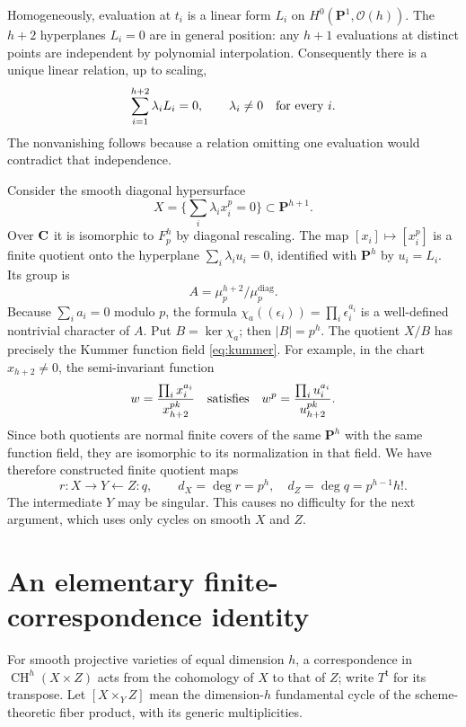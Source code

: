 \documentclass[11pt]{article}
\theoremstyle{remark}\newtheorem{remark}[theorem]{Remark}
\newcommand{\CH}{\operatorname{CH}}\newcommand{\Sym}{\operatorname{Sym}}
\begin{document}
Homogeneously, evaluation at $t_i$ is a linear form $L_i$ on
$H^0(\mathbf P^1,\mathcal O(h))$. The $h+2$ hyperplanes $L_i=0$ are in
general position: any $h+1$ evaluations at distinct points are independent
by polynomial interpolation. Consequently there is a unique linear
relation, up to scaling,
\[
 \sum_{i=1}^{h+2}\lambda_i L_i=0,
 \qquad \lambda_i\ne0\quad\hbox{for every }i.
\]
The nonvanishing follows because a relation omitting one evaluation would
contradict that independence.

Consider the smooth diagonal hypersurface
\[
 X=\{\textstyle\sum_i\lambda_i x_i^p=0\}\subset\mathbf P^{h+1}.
\]
Over $\mathbf C$ it is isomorphic to $F_p^h$ by diagonal rescaling. The map
$[x_i]\mapsto[x_i^p]$ is a finite quotient onto the hyperplane
$\sum_i\lambda_i u_i=0$, identified with $\mathbf P^h$ by $u_i=L_i$.
Its group is
\[
 A=\mu_p^{h+2}/\mu_p^{\mathrm{diag}}.
\]
Because $\sum_i a_i=0$ modulo $p$, the formula
$\chi_a((\epsilon_i))=\prod_i\epsilon_i^{a_i}$ is a well-defined
nontrivial character of $A$. Put $B=\ker\chi_a$; then $|B|=p^h$.
The quotient $X/B$ has precisely the Kummer function field
\eqref{eq:kummer}. For example, in the chart $x_{h+2}\ne0$, the
semi-invariant function
\[
 w=\frac{\prod_i x_i^{a_i}}{x_{h+2}^{pk}}
 \quad\hbox{satisfies}\quad
 w^p=\frac{\prod_i u_i^{a_i}}{u_{h+2}^{pk}}.
\]
Since both quotients are normal finite covers of the same $\mathbf P^h$
with the same function field, they are isomorphic to its normalization in
that field. We have therefore constructed finite quotient maps
\begin{equation}\label{eq:quotients}
 r:X\longrightarrow Y\longleftarrow Z:q,
 \qquad d_X=\deg r=p^h,\quad d_Z=\deg q=p^{h-1}h!.
\end{equation}
The intermediate $Y$ may be singular. This causes no difficulty for the
next argument, which uses only cycles on smooth $X$ and $Z$.

\section{An elementary finite-correspondence identity}
For smooth projective varieties of equal dimension $h$, a correspondence
in $\CH^h(X\times Z)$ acts from the cohomology of $X$ to that of $Z$;
write $T^{\mathsf t}$ for its transpose. Let $[X\times_Y Z]$ mean the
dimension-$h$ fundamental cycle of the scheme-theoretic fiber product,
with its generic multiplicities.
\end{document}
